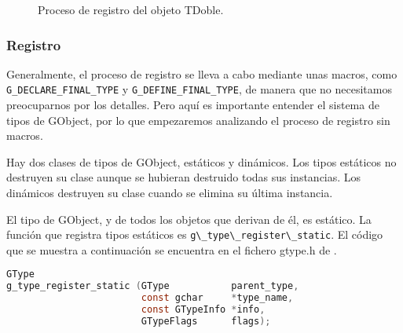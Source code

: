 \begin{figure}[ht]
\caption{Proceso de registro del objeto \textsf{TDoble}.}
\label{fig:proceso-registro}
\end{figure}

\subsubsection{Registro}
Generalmente, el proceso de registro se lleva a cabo mediante unas macros, como
\texttt{G\_DECLARE\_FINAL\_TYPE} y \texttt{G\_DEFINE\_FINAL\_TYPE}, de manera que no
necesitamos preocuparnos por los detalles. Pero aquí es importante entender el
sistema de tipos de \textsf{GObject}, por lo que empezaremos analizando el proceso
de registro sin macros.

Hay dos clases de tipos de \textsf{GObject}, estáticos y dinámicos. Los tipos estáticos
no destruyen su clase aunque se hubieran destruido todas sus instancias. Los dinámicos
destruyen su clase cuando se elimina su última instancia.

El tipo de \textsf{GObject}, y de todos los objetos que derivan de él, es estático.
La función que registra tipos estáticos es
\passthrough{\lstinline!g\_type\_register\_static!}.
El código que se muestra a continuación se encuentra en el fichero \textsf{gtype.h} de
.

\begin{lstlisting}[language=C]
GType
g_type_register_static (GType           parent_type,
                        const gchar     *type_name,
                        const GTypeInfo *info,
                        GTypeFlags      flags);
\end{lstlisting}

